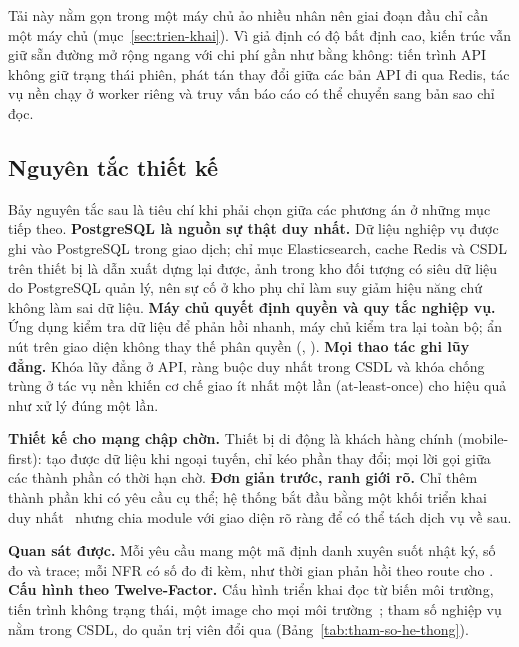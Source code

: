 Tải này nằm gọn trong một máy chủ ảo nhiều nhân nên giai đoạn đầu chỉ cần một máy chủ (mục~\ref{sec:trien-khai}). Vì giả định có độ bất định cao, kiến trúc vẫn giữ sẵn đường mở rộng ngang với chi phí gần như bằng không: tiến trình API không giữ trạng thái phiên, phát tán thay đổi giữa các bản API đi qua Redis, tác vụ nền chạy ở worker riêng và truy vấn báo cáo có thể chuyển sang bản sao chỉ đọc.

\subsection{Nguyên tắc thiết kế}\label{ssec:nguyen-tac}

Bảy nguyên tắc sau là tiêu chí khi phải chọn giữa các phương án ở những mục tiếp theo. \textbf{PostgreSQL là nguồn sự thật duy nhất.} Dữ liệu nghiệp vụ được ghi vào PostgreSQL trong giao dịch; chỉ mục Elasticsearch, cache Redis và CSDL trên thiết bị là dẫn xuất dựng lại được, ảnh trong kho đối tượng có siêu dữ liệu do PostgreSQL quản lý, nên sự cố ở kho phụ chỉ làm suy giảm hiệu năng chứ không làm sai dữ liệu. \textbf{Máy chủ quyết định quyền và quy tắc nghiệp vụ.} Ứng dụng kiểm tra dữ liệu để phản hồi nhanh, máy chủ kiểm tra lại toàn bộ; ẩn nút trên giao diện không thay thế phân quyền (, ). \textbf{Mọi thao tác ghi lũy đẳng.} Khóa lũy đẳng ở API, ràng buộc duy nhất trong CSDL và khóa chống trùng ở tác vụ nền khiến cơ chế giao ít nhất một lần (at-least-once) cho hiệu quả như xử lý đúng một lần.

\textbf{Thiết kế cho mạng chập chờn.} Thiết bị di động là khách hàng chính (mobile-first): tạo được dữ liệu khi ngoại tuyến, chỉ kéo phần thay đổi; mọi lời gọi giữa các thành phần có thời hạn chờ. \textbf{Đơn giản trước, ranh giới rõ.} Chỉ thêm thành phần khi có yêu cầu cụ thể; hệ thống bắt đầu bằng một khối triển khai duy nhất~\cite{fowlermonolith} nhưng chia module với giao diện rõ ràng để có thể tách dịch vụ về sau.

\textbf{Quan sát được.} Mỗi yêu cầu mang một mã định danh xuyên suốt nhật ký, số đo và trace; mỗi NFR có số đo đi kèm, như thời gian phản hồi theo route cho . \textbf{Cấu hình theo Twelve-Factor.} Cấu hình triển khai đọc từ biến môi trường, tiến trình không trạng thái, một image cho mọi môi trường~\cite{twelvefactor}; tham số nghiệp vụ nằm trong CSDL, do quản trị viên đổi qua  (Bảng~\ref{tab:tham-so-he-thong}).
